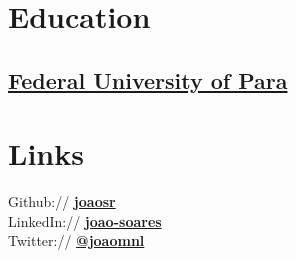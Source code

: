 \documentclass[]{joaosoares-resume}
\begin{document}
\lastupdated



\begin{minipage}[t]{0.35\textwidth} 


\section{Education}

\subsection{\href{http://www.portal.ufpa.br/}{Federal University of Para}}
\sectionsep


\section{Links} 
Github:// \href{https://github.com/joaosr}{\bf joaosr} \\
LinkedIn://  \href{www.linkedin.com/in/joao-soares}{\bf joao-soares} \\
Twitter://  \href{https://twitter.com/joao_mnl}{\bf @joao\underline{\hspace{.10in}}mnl}\\
\sectionsep


\end{minipage}
\end{document}
